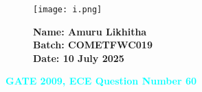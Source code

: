 \documentclass[12pt]{article}
\begin{document}
\begin{figure}[H]
    \begin{minipage}{0.45\textwidth}
        \texttt{[image: i.png]} %
    \end{minipage} \hfill
    \begin{minipage}{0.45\textwidth}
        \textbf{Name: Amuru Likhitha} \\
        \textbf{Batch: COMETFWC019} \\
        \textbf{Date: 10 July 2025}
    \end{minipage}
\end{figure}

\begin{center}
    {\LARGE \textbf{\textcolor{cyan}{GATE 2009, ECE Question Number 60}}}
\end{center}
\vspace{1em}
\end{document}

